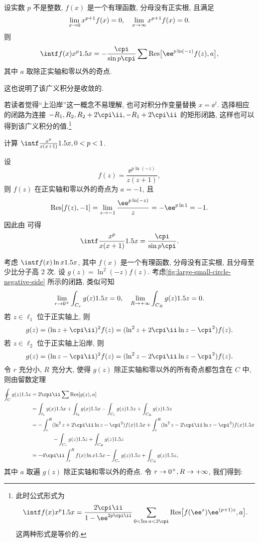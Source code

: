 \begin{theorem}
  \label{thm:integral-xp}
  设实数 $p$ 不是整数, $f(x)$ 是一个有理函数, 分母没有正实根, 且满足
  \[
    \lim_{x\rightarrow 0} x^{p+1}f(x)=0,\quad
    \lim_{x\rightarrow \infty} x^{p+1}f(x)=0.
  \]
  则
  \[
     \intf f(x)x^p\d x
    =-\frac{\cpi}{\sin{p\cpi}}\sum \Res\bigl[\ee^{p\ln(-z)}f(z),a\bigr],
  \]
  其中 $a$ 取除正实轴和零以外的奇点.
\end{theorem}
这也说明了该广义积分是收敛的.

若读者觉得``上沿岸''这一概念不易理解, 也可对积分作变量替换 $x=\ee^t$.
选择相应的闭路为连接 $-R_1,R_2,R_2+2\cpi\ii,-R_1+2\cpi\ii$ 的矩形闭路, 这样也可以得到该广义积分的值.\footnote{
  此时公式形式为
  \[
    \intf f(x)x^p\d x
    =\frac{2\cpi\ii}{1-\ee^{2p\cpi\ii}}\sum_{0<\Im a<2\cpi} \Res\bigl[f(\ee^z)\ee^{(p+1)z},a\bigr].
  \]
  这两种形式是等价的.
}

\begin{example}
  计算 $\intf\frac{x^p}{x(x+1)}\d x,0<p<1$.
\end{example}

\begin{solution}
  设
  \[
    f(z)=\frac{\ee^{p\ln(-z)}}{z(z+1)},
  \]
  则 $f(z)$ 在正实轴和零以外的奇点为 $a=-1$, 且
  \[
     \Res[f(z),-1]
    =\lim_{z\ra-1}\frac{\ee^{p\ln(-z)}}{z}
    =-\ee^{p\ln 1}
    =-1.
  \]
  因此由 可得
  \[
     \intf\frac{x^p}{x(x+1)}\d x
    =\frac{\cpi}{\sin p\cpi}.
  \]
\end{solution}

考虑 $\intf f(x)\ln x\d x$, 其中 $f(x)$ 是一个有理函数, 分母没有正实根, 且分母至少比分子高 $2$ 次.
设 $g(z)=\ln^2(-z)f(z)$.
考虑\ref{fig:large-small-circle-negative-side} 所示的闭路, 类似可知
\[
  \lim_{r\rightarrow0^+}\int_{C_r}g(z)1.5 z=0,\quad 
  \lim_{R\rightarrow+\infty}\int_{C_R}g(z)1.5 z=0.
\]
若 $z\in\ell_1$ 位于正实轴上, 则
\[
   g(z)
  =(\ln z+\cpi\ii)^2f(z)
  =(\ln^2 z+2\cpi\ii \ln z-\cpi^2)f(z).
\]
若 $z\in\ell_2$ 位于正实轴上沿岸, 则
\[
   g(z)
  =(\ln z-\cpi\ii)^2f(z)
  =(\ln^2 z-2\cpi\ii \ln z-\cpi^2)f(z).
\]
令 $r$ 充分小, $R$ 充分大, 使得 $g(z)$ 除正实轴和零以外的所有奇点都包含在 $C$ 中, 则由留数定理
\begin{align*}
   \oint_Cg(z)\d z&
  =2\cpi\ii\sum \Res[g(z),a]\\&
  =\int_{\ell_1} g(x)\d x
    +\int_{\ell_2} g(x)\d x
    -\int_{C_r}g(z)\d z
    +\int_{C_R}g(z)\d z\\&
  =-\int_r^R (\ln^2 z+2\cpi\ii \ln z-\cpi^2)f(x)\d x
    +\int_r^R (\ln^2 z-2\cpi\ii \ln z-\cpi^2)f(x)\d x\\&
    \qquad \qquad 
    -\int_{C_r}g(z)\d z
    +\int_{C_R}g(z)\d z\\&
  =-4\cpi\ii \int_r^R f(x)\ln x\d x
  -\int_{C_r}g(z)\d z
  +\int_{C_R}g(z)\d z,
\end{align*}
其中 $a$ 取遍 $g(z)$ 除正实轴和零以外的奇点.
令 $r\rightarrow0^+,R\rightarrow +\infty$, 我们得到:


